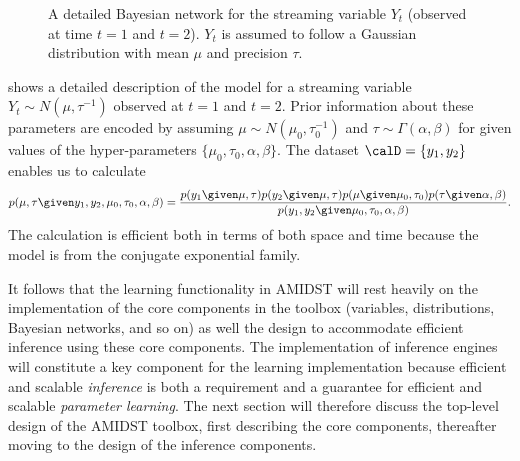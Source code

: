 \begin{figure}[htb]
  \begin{center}
  \end{center}
  \caption{A detailed Bayesian network for the streaming variable $Y_t$ (observed at time $t=1$ and $t=2$). $Y_t$ is assumed to follow a Gaussian distribution with mean $\mu$ and precision $\tau$.}
  \label{fig:bayesLearnDetail}
\end{figure}



  shows a detailed description of the model for a streaming variable $Y_t\sim N\left(\mu,\tau^{-1}\right)$ observed  at $t=1$ and  $t=2$. 
Prior information about these parameters are encoded by assuming $\mu\sim N\left(\mu_0, \tau_0^{-1}\right)$ and $\tau\sim\Gamma(\alpha,\beta)$ for given values of the hyper-parameters $\{\mu_0,\tau_0,\alpha,\beta\}$.
The dataset $\calD=\{y_1,y_2\}$ enables us to calculate 
$$
p(\mu,\tau\given y_1,y_2, \mu_0,\tau_0,\alpha,\beta) = \frac{p(y_1\given \mu,\tau)p(y_2\given \mu,\tau)p(\mu\given \mu_0,\tau_0)p(\tau\given\alpha,\beta)}{p(y_1,y_2\given  \mu_0,\tau_0,\alpha,\beta)}.
$$
The calculation is efficient both in terms of both space and time because the model is from the conjugate exponential family. 

It follows that the learning functionality in AMIDST will rest  heavily on the implementation of the core components in the toolbox (variables, distributions, Bayesian networks, and so on) as well the design to accommodate efficient inference using these core components. The implementation of inference engines will constitute a key component for the learning implementation because  efficient and scalable \textit{inference} is both a requirement and a  guarantee for efficient and scalable \textit{parameter learning}. The next section will therefore discuss the top-level design of the AMIDST toolbox, first describing the core components, thereafter moving to the design of the inference components. 






